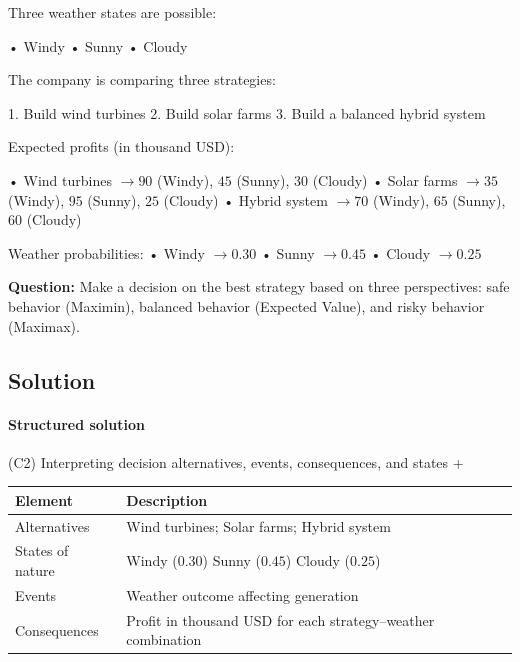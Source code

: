 \documentclass[11pt]{article}
\begin{document}
	
	Three weather states are possible:
	
	
	
	
	
	
	• Windy
	• Sunny
	• Cloudy
	
	
	
	
	
	
	The company is comparing three strategies:
	
	1. Build wind turbines
	2. Build solar farms
	3. Build a balanced hybrid system
	
	
	
	
	
	
	Expected profits (in thousand USD):
	
	
	
	
	• Wind turbines $\to 90$ (Windy), $45$ (Sunny), $30$ (Cloudy)
	• Solar farms $\to 35$ (Windy), $95$ (Sunny), $25$ (Cloudy)
	• Hybrid system $\to 70$ (Windy), $65$ (Sunny), $60$ (Cloudy)
	
	
	
	
	
	
	Weather probabilities:
	• Windy $\to 0.30$
	• Sunny $\to 0.45$
	• Cloudy $\to 0.25$
	
	
	
	
	
	\textbf{Question:} Make a decision on the best strategy based on three perspectives:
	safe behavior (Maximin), balanced behavior (Expected Value), and risky behavior (Maximax).
	
	\subsection*{Solution}
	
	\hypertarget{problem2-solution}{}
	
	\paragraph{Structured solution}
	
	
	(C2) Interpreting decision alternatives, events, consequences, and states
	+
	
	
	\begin{center}
		\begin{tabular}{ll}
			\toprule
			Element & Description \\
			\midrule
			Alternatives & Wind turbines; Solar farms; Hybrid system \\
			States of nature & Windy
			($0.30$)
			Sunny
			($0.45$)
			Cloudy
			($0.25$) \\
			Events & Weather outcome affecting generation \\
			Consequences & Profit in thousand USD for each strategy–weather combination \\
			\bottomrule
		\end{tabular}
	\end{center}
	
\end{document}
